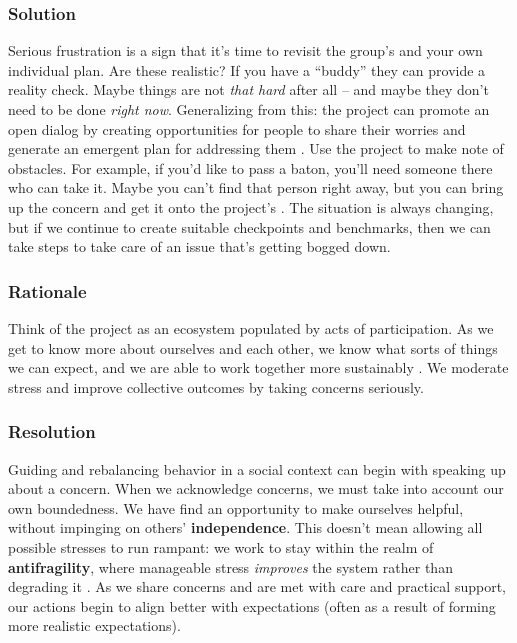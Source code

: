 \subsubsection*{Solution}

Serious frustration is a sign that it's time to revisit the group's  and your own individual plan.  Are these realistic?  If you have a ``buddy'' they can provide a reality check.   Maybe things are not \emph{that hard} after all -- and maybe they don't need to be done \emph{right now}.  Generalizing from this: the project can promote an open dialog by creating opportunities for people to share their worries and generate an emergent plan for addressing them \cite{seikkula2006dialogical}.  Use the project  to make note of obstacles.  For example, if you'd like to pass a baton, you'll need someone there who can take it.  Maybe you can't find that person right away, but you can bring up the concern and get it onto the project's .  The situation is always changing, but if we continue to create suitable checkpoints and benchmarks, then we can take steps to take care of an issue that's getting bogged down.    

\subsubsection*{Rationale}

Think of the project as an ecosystem populated by acts of participation.  As we get to know more about ourselves and each other, we know what sorts of things we can expect, and we are able to work together more sustainably \cite{ostrom2010revising}.
%
We moderate stress and improve collective outcomes by taking concerns seriously.

\subsubsection*{Resolution}

Guiding and rebalancing behavior in a social context can begin with speaking up about a concern.  When we acknowledge concerns, we must take into account our own boundedness.  We have find an opportunity to make ourselves helpful, without impinging on others' \textbf{independence}.   This doesn't mean allowing all possible stresses to run rampant: we work to stay within the realm of \textbf{antifragility}, where manageable stress \emph{improves} the system rather than degrading it \cite{taleb2012antifragile}. 
%
As we share concerns and are met with care and practical support, our actions begin to align better with expectations (often as a result of forming more realistic expectations). 

